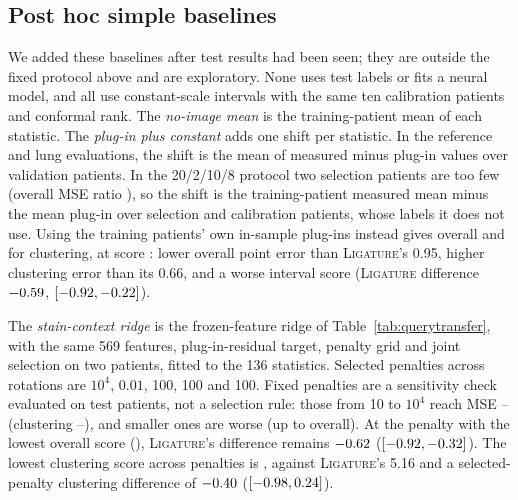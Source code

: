 \documentclass[10pt,letterpaper]{article}
\theoremstyle{definition}
\theoremstyle{remark}
\newcommand{\method}{\textnormal{\textsc{Ligature}}}
\begin{document}
\subsection{Post hoc simple baselines}
\label{app:simple}
We added these baselines after test results had been seen; they are outside the fixed protocol above and are exploratory. None uses test labels or fits a neural model, and all use constant-scale intervals with the same ten calibration patients and conformal rank. The \emph{no-image mean} is the training-patient mean of each statistic. The \emph{plug-in plus constant} adds one shift per statistic. In the reference and lung evaluations, the shift is the mean of measured minus plug-in values over validation patients. In the 20/2/10/8 protocol two selection patients are too few (overall MSE ratio \BaseSelectionAll{}), so the shift is the training-patient measured mean minus the mean plug-in over selection and calibration patients, whose labels it does not use. Using the training patients' own in-sample plug-ins instead gives \BaseInsampleAll{} overall and \BaseInsampleSame{} for clustering, at score \BaseInsampleScore{}: lower overall point error than \method{}'s 0.95, higher clustering error than its 0.66, and a worse interval score (\method{} difference $-0.59$, $[-0.92,-0.22]$).

The \emph{stain-context ridge} is the frozen-feature ridge of Table~\ref{tab:querytransfer}, with the same 569 features, plug-in-residual target, penalty grid and joint selection on two patients, fitted to the 136 statistics. Selected penalties across rotations are $10^4$, $0.01$, 100, 100 and 100. Fixed penalties are a sensitivity check evaluated on test patients, not a selection rule: those from 10 to $10^4$ reach MSE \BaseFixedAllLo--\BaseFixedAllHi{} (clustering \BaseFixedSameLo--\BaseFixedSameHi), and smaller ones are worse (up to \BaseFixedWorstAll{} overall). At the penalty with the lowest overall score (\BaseFixedMinScore{}), \method{}'s difference remains $-0.62$ ($[-0.92,-0.32]$). The lowest clustering score across penalties is \BaseFixedMinSameScore{}, against \method{}'s 5.16 and a selected-penalty clustering difference of $-0.40$ ($[-0.98,0.24]$).
\end{document}

